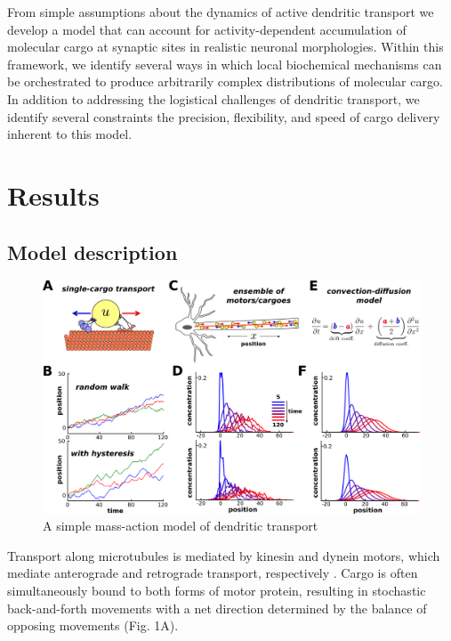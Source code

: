 \documentclass[10pt]{wlpeerj}
\begin{document}
From simple assumptions about the dynamics of active dendritic transport we develop a model that can account for activity-dependent accumulation of molecular cargo at synaptic sites in realistic neuronal morphologies.
Within this framework, we identify several ways in which local biochemical mechanisms can be orchestrated to produce arbitrarily complex distributions of molecular cargo.
In addition to addressing the logistical challenges of dendritic transport, we identify several constraints the precision, flexibility, and speed of cargo delivery inherent to this model.

\hl{}

\section*{Results}

\subsection*{Model description}

\begin{figure}[!tb]
\begin{center}
\includegraphics[width=0.9\columnwidth]{00_stochastic.png}
\caption{A simple mass-action model of dendritic transport}
\end{center}
\end{figure}

Transport along microtubules is mediated by kinesin and dynein motors, which mediate anterograde and retrograde transport, respectively \citep{Hirokawa_2010,Gagnon_2011}.
Cargo is often simultaneously bound to both forms of motor protein, resulting in stochastic back-and-forth movements with a net direction determined by the balance of opposing movements \citep{Hancock_2014,Buxbaum_2014b} (Fig. 1A).
\end{document}
